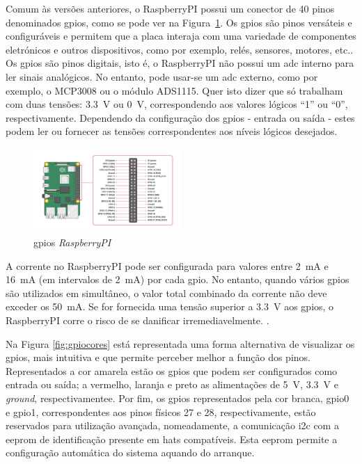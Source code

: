 Comum às versões anteriores, o \gls{RaspberryPI} possui um conector de 40 pinos denominados \acrfull{gpio}s, como se pode ver na Figura~\ref{fig:gpio}. Os \acrshort{gpio}s são pinos versáteis e configuráveis e permitem que a placa interaja com uma variedade de componentes eletrónicos e outros dispositivos, como por exemplo, relés, sensores, motores, etc.. Os \acrshort{gpio}s são pinos digitais, isto é, o \gls{RaspberryPI} não possui um \acrfull{adc} interno para ler sinais analógicos. No entanto, pode usar-se um \acrshort{adc} externo, como por exemplo, o MCP3008 ou o módulo ADS1115. Quer isto dizer que só trabalham com duas tensões: \SI{3.3}{\volt} ou \SI{0}{\volt}, correspondendo aos valores lógicos ``1'' ou ``0'', respectivamente. Dependendo da configuração dos \acrshort{gpio}s - entrada ou saída - estes podem ler ou fornecer as tensões correspondentes aos níveis lógicos desejados. 

\begin{figure}[hbtp]
    \centering
    \includegraphics[width=0.5\textwidth]{figures/GPIO-Pinout-Diagram-2.png}
    \caption{\acrshort{gpio}s \textit{RaspberryPI} \cite{Raspberrytech}}
    \label{fig:gpio}
\end{figure}

A corrente no \gls{RaspberryPI} pode ser configurada para valores entre \SI{2}{\milli\ampere} e \SI{16}{\milli\ampere} (em intervalos de \SI{2}{\milli\ampere}) por cada \acrshort{gpio}. No entanto, quando vários \acrshort{gpio}s são utilizados em simultâneo, o valor total combinado da corrente não deve exceder os \SI{50}{\milli\ampere}. Se for fornecida uma tensão superior a \SI{3.3}{\volt} aos \acrshort{gpio}s, o \gls{RaspberryPI} corre o risco de se danificar irremediavelmente. \cite{Raspberrytech}. 

Na Figura \ref{fig:gpiocores} está representada uma forma alternativa de visualizar os \acrshort{gpio}s, mais intuitiva e que permite perceber melhor a função dos pinos. Representados a cor amarela estão os \acrshort{gpio}s que podem ser configurados como entrada ou saída; a vermelho, laranja e preto as alimentações de \SI{5}{\volt}, \SI{3.3}{\volt} e \textit{ground}, respectivamentee. Por fim, os \acrshort{gpio}s representados pela cor branca, \acrshort{gpio}0  e \acrshort{gpio}1, correspondentes aos pinos físicos 27 e 28, respectivamente, estão reservados para utilização avançada, nomeadamente, a comunicação \acrshort{i2c} com a \gls{eeprom} de identificação presente em \gls{hat}s compatíveis. Esta \gls{eeprom} permite a configuração automática do sistema aquando do arranque. 

